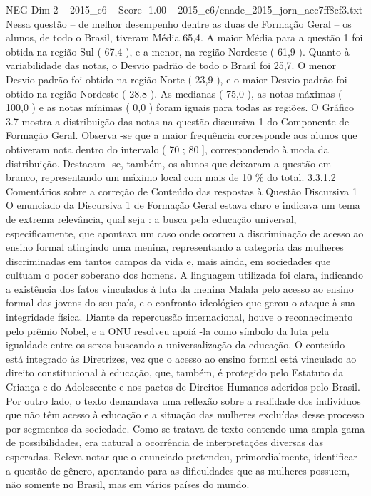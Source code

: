 \begin{textsample}{NEG Dim 2 – 2015\_c6 – Score -1.00 – 2015\_c6/enade\_2015\_jorn\_aec7ff8cf3.txt}
Nessa questão – de melhor desempenho dentre as duas de Formação Geral – os alunos, de todo o Brasil, tiveram Média 65,4.
A maior Média para a questão 1 foi obtida na região Sul ( 67,4 ), e a menor, na região Nordeste ( 61,9 ).
Quanto à variabilidade das notas, o Desvio padrão de todo o Brasil foi 25,7.
O menor Desvio padrão foi obtido na região Norte ( 23,9 ), e o maior Desvio padrão foi obtido na região Nordeste ( 28,8 ).
As medianas ( 75,0 ), as notas máximas ( 100,0 ) e as notas mínimas ( 0,0 ) foram iguais para todas as regiões.
O Gráfico 3.7 mostra a distribuição das notas na questão discursiva 1 do Componente de Formação Geral.
Observa -se que a maior frequência corresponde aos alunos que obtiveram nota dentro do intervalo ( 70 ; 80 ], correspondendo à moda da distribuição.
Destacam -se, também, os alunos que deixaram a questão em branco, representando um máximo local com mais de 10 \% do total. 3.3.1.2 Comentários sobre a correção de Conteúdo das respostas à Questão Discursiva 1 O enunciado da Discursiva 1 de Formação Geral estava claro e indicava um tema de extrema relevância, qual seja : a busca pela educação universal, especificamente, que apontava um caso onde ocorreu a discriminação de acesso ao ensino formal atingindo uma menina, representando a categoria das mulheres discriminadas em tantos campos da vida e, mais ainda, em sociedades que cultuam o poder soberano dos homens.
A linguagem utilizada foi clara, indicando a existência dos fatos vinculados à luta da menina Malala pelo acesso ao ensino formal das jovens do seu país, e o confronto ideológico que gerou o ataque à sua integridade física.
Diante da repercussão internacional, houve o reconhecimento pelo prêmio Nobel, e a ONU resolveu apoiá -la como símbolo da luta pela igualdade entre os sexos buscando a universalização da educação.
O conteúdo está integrado às Diretrizes, vez que o acesso ao ensino formal está vinculado ao direito constitucional à educação, que, também, é protegido pelo Estatuto da Criança e do Adolescente e nos pactos de Direitos Humanos aderidos pelo Brasil.
Por outro lado, o texto demandava uma reflexão sobre a realidade dos indivíduos que não têm acesso à educação e a situação das mulheres excluídas desse processo por segmentos da sociedade.
Como se tratava de texto contendo uma ampla gama de possibilidades, era natural a ocorrência de interpretações diversas das esperadas.
Releva notar que o enunciado pretendeu, primordialmente, identificar a questão de gênero, apontando para as dificuldades que as mulheres possuem, não somente no Brasil, mas em vários países do mundo.

\end{textsample}
